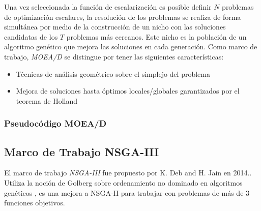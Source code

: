 \documentclass[letterpaper,10pt]{article}
\begin{document}
Una vez seleccionada la función de escalarización es posible definir $N$ problemas de optimización escalares, la resolución de los problemas se realiza de forma simultánea
por medio de la construcción de un nicho con las soluciones candidatas de los $T$ problemas más cercanos. Este nicho es la población de un algoritmo genético
que mejora las soluciones en cada generación. Como marco de trabajo, \emph{MOEA/D} se distingue por tener las siguientes características:

 \begin{itemize}
 \item Técnicas de análisis geométrico sobre el simplejo del problema \cite{mie99,Das:1998:NIN:588907.589322, Messac2003}
 \item Mejora de soluciones hasta óptimos locales/globales garantizados por el teorema de Holland\cite{Holland:1992:ANA:531075}
 \end{itemize}


\subsubsection{Pseudocódigo MOEA/D}


\subsection{Marco de Trabajo NSGA-III}

El marco de trabajo \emph{NSGA-III} fue propuesto por K. Deb and H. Jain en 2014.\cite{6600851}. Utiliza la noción de Golberg sobre ordenamiento no dominado en algoritmos genéticos \cite{goldberg1988genetic}
, es una mejora a NSGA-II para trabajar con problemas de más de $3$ funciones objetivos.
\end{document}

